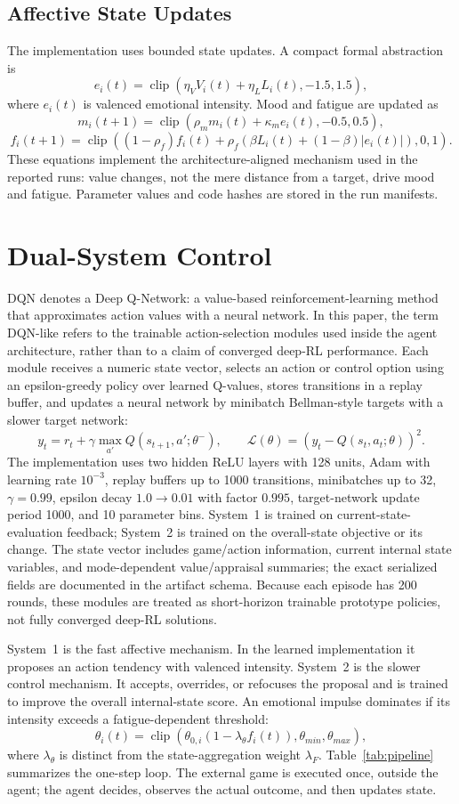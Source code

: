 \documentclass[runningheads]{llncs}
\newcommand{\clip}{\operatorname{clip}}
\begin{document}
\subsection{Affective State Updates}
The implementation uses bounded state updates. A compact formal abstraction is
\[
e_i(t)=\clip(\eta_V V_i(t)+\eta_L L_i(t),-1.5,1.5),
\]
where $e_i(t)$ is valenced emotional intensity. Mood and fatigue are updated as
\[
m_i(t+1)=\clip(\rho_m m_i(t)+\kappa_m e_i(t),-0.5,0.5),
\]
\[
f_i(t+1)=\clip((1-\rho_f)f_i(t)+\rho_f(\beta L_i(t)+(1-\beta)|e_i(t)|),0,1).
\]
These equations implement the architecture-aligned mechanism used in the reported runs: value changes, not the mere distance from a target, drive mood and fatigue. Parameter values and code hashes are stored in the run manifests.

\section{Dual-System Control}
DQN denotes a Deep Q-Network: a value-based reinforcement-learning method that approximates action values with a neural network. In this paper, the term DQN-like refers to the trainable action-selection modules used inside the agent architecture, rather than to a claim of converged deep-RL performance. Each module receives a numeric state vector, selects an action or control option using an epsilon-greedy policy over learned Q-values, stores transitions in a replay buffer, and updates a neural network by minibatch Bellman-style targets with a slower target network:
\[
y_t=r_t+\gamma\max_{a'}Q(s_{t+1},a';\theta^-),\qquad
\mathcal{L}(\theta)=(y_t-Q(s_t,a_t;\theta))^2.
\]
The implementation uses two hidden ReLU layers with 128 units, Adam with learning rate $10^{-3}$, replay buffers up to 1000 transitions, minibatches up to 32, $\gamma=0.99$, epsilon decay $1.0\rightarrow0.01$ with factor $0.995$, target-network update period 1000, and 10 parameter bins. System~1 is trained on current-state-evaluation feedback; System~2 is trained on the overall-state objective or its change. The state vector includes game/action information, current internal state variables, and mode-dependent value/appraisal summaries; the exact serialized fields are documented in the artifact schema. Because each episode has 200 rounds, these modules are treated as short-horizon trainable prototype policies, not fully converged deep-RL solutions.

System~1 is the fast affective mechanism. In the learned implementation it proposes an action tendency with valenced intensity. System~2 is the slower control mechanism. It accepts, overrides, or refocuses the proposal and is trained to improve the overall internal-state score. An emotional impulse dominates if its intensity exceeds a fatigue-dependent threshold:
\[
\theta_i(t)=\clip(\theta_{0,i}(1-\lambda_\theta f_i(t)),\theta_{min},\theta_{max}),
\]
where $\lambda_\theta$ is distinct from the state-aggregation weight $\lambda_F$. Table~\ref{tab:pipeline} summarizes the one-step loop. The external game is executed once, outside the agent; the agent decides, observes the actual outcome, and then updates state.
\end{document}
